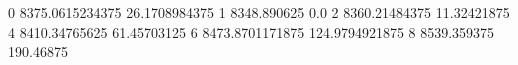 0 8375.0615234375 26.1708984375
1 8348.890625 0.0
2 8360.21484375 11.32421875
4 8410.34765625 61.45703125
6 8473.8701171875 124.9794921875
8 8539.359375 190.46875
